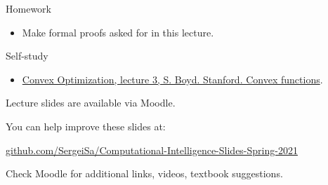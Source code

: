 \documentclass{beamer}
\begin{document}
\begin{frame}{Homework}
\begin{flushleft}

\begin{itemize}
    \item Make formal proofs asked for in this lecture.
\end{itemize}

\end{flushleft}
\end{frame}


\begin{frame}{Self-study}
\begin{flushleft}

\begin{itemize}
    \item \href{https://www.youtube.com/watch?v=kcOodzDGV4c}{Convex Optimization, lecture 3, S. Boyd. Stanford. Convex functions}.
\end{itemize}

\end{flushleft}
\end{frame}



\begin{frame}
\centerline{Lecture slides are available via Moodle.}
\bigskip
\centerline{You can help improve these slides at:}
\centerline{
\textcolor{blue}{\href{https://github.com/SergeiSa/Computational-Intelligence-Slides-Spring-2021}{github.com/SergeiSa/Computational-Intelligence-Slides-Spring-2021}}
}
\bigskip

\textcolor{black}{}
\bigskip


\centerline{Check Moodle for additional links, videos, textbook suggestions.}
\end{frame}
\end{document}
